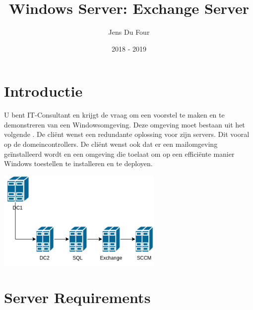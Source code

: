 \documentclass[a4paper]{article}
\title{Windows Server: Exchange Server}
\author{Jens Du Four}
\date{2018 - 2019}
\begin{document}
\maketitle

\section{Introductie}
U bent IT-Consultant en krijgt de vraag om een voorstel te maken en te demonstreren van een Windowsomgeving. Deze omgeving moet bestaan uit het volgende . De cliënt wenst een redundante oplossing voor zijn servers. Dit vooral op de domeincontrollers. De cliënt wenst ook dat er een mailomgeving geïnstalleerd wordt en een omgeving die toelaat om op een efficiënte manier Windows toestellen te installeren en te deployen.

\begin{center}
\includegraphics[width=8cm]{Netwerkdiagram.png}
\end{center}

\section{Server Requirements}
\end{document}
